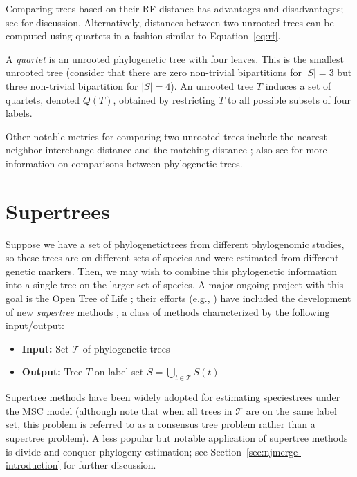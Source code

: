 Comparing trees based on their RF distance has advantages and disadvantages; see \cite{lin2012metric, kuhner2014practical} for discussion.
Alternatively, distances between two unrooted trees can be computed using quartets in a fashion similar to Equation~\ref{eq:rf}.

\begin{definition}[Quartet]
\label{def:quartet}
A \emph{\gls{quartet}} is an unrooted phylogenetic tree with four leaves.
This is the smallest unrooted tree (consider that there are zero non-trivial bipartitions for $|S| = 3$ but three non-trivial bipartition for $|S|=4$).
An unrooted tree $T$ induces a set of quartets, denoted $Q(T)$, obtained by restricting $T$ to all possible subsets of four labels.
\end{definition}

Other notable metrics for comparing two unrooted trees include the nearest neighbor interchange distance \cite{robinson1971comparison, moore1973iterative} and the matching distance \cite{lin2012metric}; also see \cite{kuhner2014practical} for more information on comparisons between phylogenetic trees.

\section{Supertrees}
\label{sec:background-supertrees}
Suppose we have a set of \glspl{phylogenetictree} from different \gls{phylogenomic} studies, so these trees are on different sets of species and were estimated from different genetic markers.
Then, we may wish to combine this phylogenetic information into a single tree on the larger set of species.
A major ongoing project with this goal is the Open Tree of Life \cite{hinchliff2015synthesis}; their efforts (e.g., \cite{redelings2017supertree}) have included the development of new \textit{\gls{supertree}} methods \cite{bininda2004phylogenetic}, a class of methods characterized by the following input/output:
\begin{itemize}
	\item {\bf Input:} Set $\mathcal{T}$ of phylogenetic trees
	\item {\bf Output:} Tree $T$ on label set $S = \bigcup_{t \in \mathcal{T}} S(t)$
\end{itemize}
Supertree methods have been widely adopted for estimating \glspl{speciestree} under the \gls{MSC} model (although note that when all trees in $\mathcal{T}$ are on the same label set, this problem is referred to as a consensus tree problem rather than a supertree problem).
A less popular but notable application of supertree methods is divide-and-conquer phylogeny estimation; see Section~\ref{sec:njmerge-introduction} for further discussion.

